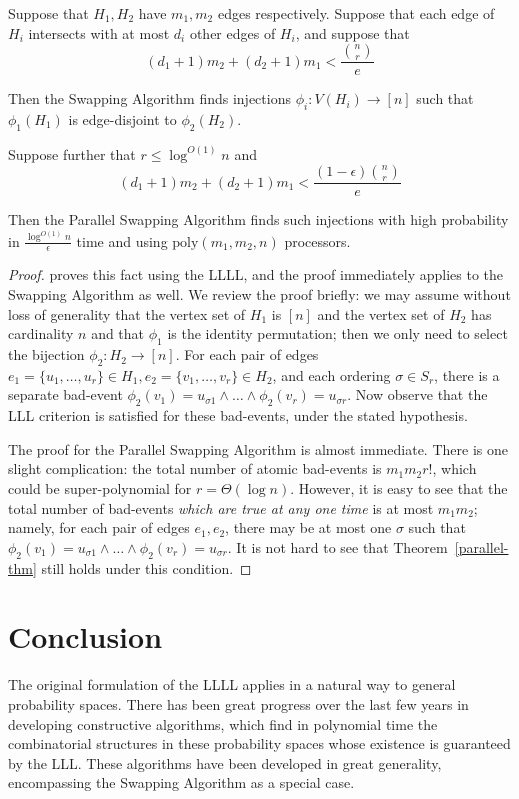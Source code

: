 \begin{theorem}
Suppose that $H_1, H_2$ have $m_1, m_2$ edges respectively. Suppose that each edge of $H_i$ intersects with at most $d_i$ other edges of $H_i$, and suppose that
$$
(d_1 + 1) m_2 + (d_2 + 1) m_1 < \frac{\binom{n}{r}}{e}
$$

Then the Swapping Algorithm finds injections $\phi_i: V(H_i) \rightarrow [n]$ such that $\phi_1(H_1)$ is edge-disjoint to $\phi_2(H_2)$.

Suppose further that $r \leq \log^{O(1)} n$ and
$$
(d_1 + 1) m_2 + (d_2 + 1) m_1 < \frac{(1-\epsilon) \binom{n}{r}}{e}
$$

Then the Parallel Swapping Algorithm finds such injections with high probability in $\frac{\log^{O(1)} n}{\epsilon}$ time and using $\text{poly}(m_1, m_2, n)$ processors.
\end{theorem}
\begin{proof}
\cite{random-inj} proves this fact using the LLLL, and the proof immediately applies to the Swapping Algorithm as well. We review the proof briefly: we may assume without loss of generality that the vertex set of $H_1$ is $[n]$ and the vertex set of $H_2$ has cardinality $n$ and that $\phi_1$ is the identity permutation; then we only need to select the bijection $\phi_2: H_2 \rightarrow [n]$. For each pair of edges $e_1 = \{u_1, \dots, u_r \} \in H_1, e_2 = \{v_1, \dots, v_r \} \in H_2$, and each ordering $\sigma \in S_r$, there is a separate bad-event $\phi_2( v_1 ) = u_{\sigma 1} \wedge \dots \wedge \phi_2 (v_r) = u_{\sigma r}$. Now observe that the LLL criterion is satisfied for these bad-events, under the stated hypothesis.

The proof for the Parallel Swapping Algorithm is almost immediate. There is one slight complication: the total number of atomic bad-events is $m_1 m_2 r!$, which could be super-polynomial for $r = \Theta(\log n)$. However, it is easy to see that the total number of bad-events \emph{which are true at any one time} is at most $m_1 m_2$; namely, for each pair of edges $e_1, e_2$, there may be at most one $\sigma$ such that $\phi_2( v_1 ) = u_{\sigma 1} \wedge \dots \wedge \phi_2 (v_r) = u_{\sigma r}$. It is not hard to see that Theorem~\ref{parallel-thm} still holds under this condition.
\end{proof}

\section{Conclusion}
\label{sec:conclusion}
The original formulation of the LLLL \cite{erdos-spencer} applies in a natural way to general probability spaces. There has been great progress over the last few years in developing constructive algorithms, which find in polynomial time the combinatorial structures in these probability spaces whose existence is guaranteed by the LLL. These algorithms have been developed in great generality, encompassing the Swapping Algorithm as a special case. 

